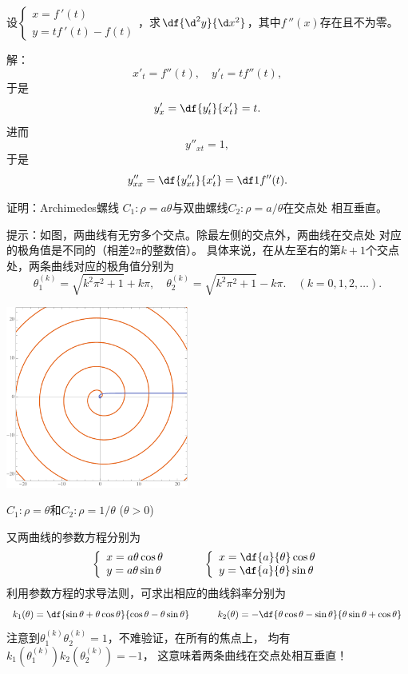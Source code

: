\bs
\egz 设$\left\{\begin{array}{l}x=f\,'(t)\\ y=tf\,'(t)-f(t)
\end{array}\right.$，求$\df{\d^2y}{\d x^2}$，其中$f\,''(x)$存在且不为零。

解：
$$x'_t=f''(t),\quad y'_t=tf''(t),$$
于是
$$y'_x=\df{y'_t}{x'_t}=t.$$
进而
$$y''_{xt}=1,$$
于是
$$y''_{xx}=\df{y''_{xt}}{x'_t}=\df1{f''(t)}.$$
\fin

\begin{shaded}
	\egz 证明：{\kaishu Archimedes螺线}
	$C_1:\rho=a\theta$与双曲螺线$C_2:\rho=a/\theta$在交点处
	相互垂直。

	提示：如图，两曲线有无穷多个交点。除最左侧的交点外，两曲线在交点处
	对应的极角值是不同的（相差$2\pi$的整数倍）。
	具体来说，在从左至右的第$k+1$个交点处，两条曲线对应的极角值分别为
	$$\theta_1^{(k)}=\sqrt{k^2\pi^2+1}+k\pi,
	\quad \theta_2^{(k)}=\sqrt{k^2\pi^2+1}-k\pi.
	\quad (k=0,1,2,\ldots).$$
	\begin{center}
		\includegraphics[width=0.45\textwidth]
		{./images/ch02/arCurve.pdf}
		
		{\kaishu$C_1:\rho=\theta$和$C_2:\rho=1/\theta$
		\quad($\theta>0$)
		}
	\end{center}
	又两曲线的参数方程分别为
	$$
	\left\{\begin{array}{l}
		x=a\theta\cos\theta\\
		y=a\theta\sin\theta
	\end{array}\right.
	\quad\quad\quad
	\left\{\begin{array}{l}
		x=\df{a}{\theta}\cos\theta\\
		y=\df{a}{\theta}\sin\theta
	\end{array}\right.
	$$
	利用参数方程的求导法则，可求出相应的曲线斜率分别为
	$$k_1(\theta)=\df{\sin\theta+\theta\cos\theta}{\cos\theta-\theta\sin\theta}
	\quad\quad\quad
	k_2(\theta)=-\df{\theta\cos\theta-\sin\theta}{\theta\sin\theta+\cos\theta}
	$$
	注意到$\theta_1^{(k)}\theta_2^{(k)}=1$，不难验证，在所有的焦点上，
	均有$k_1(\theta_1^{(k)})k_2(\theta_2^{(k)})=-1$，
	这意味着两条曲线在交点处相互垂直！
\end{shaded}

